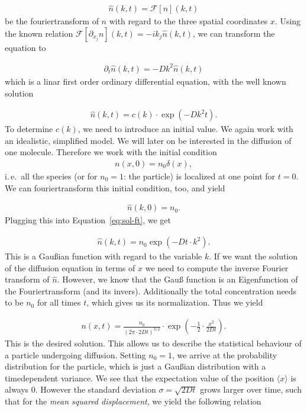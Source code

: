 \begin{align*}
  \hat n(k,t) = \mathcal{F}[n](k,t)
\end{align*}
be the fouriertransform of $n$ with regard to the three spatial
coordinates $x$. Using the known relation $\mathcal{F}[\partial_{x_j}
n](k,t) = -ik_j \hat n(k,t)$, we can transform the equation to

\begin{align*}
  \partial_t \hat n(k,t) =  - Dk^2 \hat n(k,t)
\end{align*}
which is a linar first order ordinary differential equation, with the
well known solution

\begin{align}
  \hat n(k,t) = c(k) \cdot \exp(-Dk^2 t). \label{eq:sol-ft}
\end{align}
To determine $c(k)$, we need to introduce an initial value. We again
work with an idealistic, simplified model. We will later on be
interested in the diffusion of one molecule. Therefore we work with
the initial condition
\begin{align*}
  n(x,0) = n_0 \delta(x),
\end{align*}
i.\,e.\ all the species (or for $n_0 = 1$: the particle) is localized
at one point for $t = 0$. We can fouriertransform this initial
condition, too, and yield

\begin{align*}
  \hat n(k,0) = n_0.
\end{align*}
Plugging this into Equation~\eqref{eq:sol-ft}, we get

\begin{align*}
  \hat n(k,t) = n_0 \exp(-Dt \cdot k^2).
\end{align*}
This is a Gaußian function with regard to the variable $k$. If we want
the solution of the diffusion equation in terms of $x$ we need to
compute the inverse Fourier transform of $\hat n$. However, we know
that the Gauß function is an Eigenfunction of the Fouriertransform
(and its invers). Additionally the total concentration needs to be $n_0$
for all times $t$, which gives us its normalization. Thus we yield

\begin{align*}
  n(x,t) = \frac{n_0}{(2\pi \cdot 2Dt)^{3/2}} \cdot \exp \left(
  -\frac{1}{2} \cdot \frac{x^2}{2Dt} \right).
\end{align*}
This is the desired solution. This allows us to describe the statistical
behaviour of a particle undergoing diffusion. Setting $n_0 = 1$, we
arrive at the probability distribution for the particle, which is just
a Gaußian distribution with a timedependent variance. We see that the
expectation value of the position $\langle x \rangle$ is always
0. However the standard deviation $\sigma = \sqrt{2Dt}$ grows larger
over time, such that for the \emph{mean squared displacement}, we
yield the following relation

